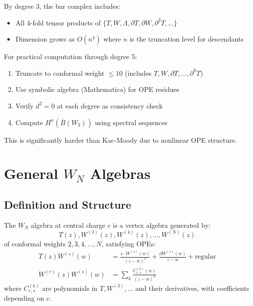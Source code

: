 \begin{remark}
By degree 3, the bar complex includes:
\begin{itemize}
\item All 4-fold tensor products of $\{T, W, \Lambda, \partial T, \partial W, \partial^2 T, \ldots\}$
\item Dimension grows as $O(n^4)$ where $n$ is the truncation level for descendants
\end{itemize}

For practical computation through degree 5:
\begin{enumerate}
\item Truncate to conformal weight $\le 10$ (includes $T, W, \partial T, \ldots, \partial^8 T$)
\item Use symbolic algebra (Mathematica) for OPE residues
\item Verify $d^2 = 0$ at each degree as consistency check
\item Compute $H^n(\bar{B}(W_3))$ using spectral sequences
\end{enumerate}

This is significantly harder than Kac-Moody due to nonlinear OPE structure.
\end{remark}

\section{General $W_N$ Algebras}

\subsection{Definition and Structure}

\begin{definition}[$W_N$ Algebra]
The $W_N$ algebra at central charge $c$ is a vertex algebra generated by:
$$T(z), W^{(3)}(z), W^{(4)}(z), \ldots, W^{(N)}(z)$$
of conformal weights $2, 3, 4, \ldots, N$, satisfying OPEs:
\begin{align*}
T(z)W^{(s)}(w) &= \frac{s \cdot W^{(s)}(w)}{(z-w)^2} + \frac{\partial W^{(s)}(w)}{z-w} + \text{regular} \\
W^{(r)}(z)W^{(s)}(w) &= \sum_{k} \frac{C_{r,s}^{(k)}(w)}{(z-w)^{k}}
\end{align*}
where $C_{r,s}^{(k)}$ are polynomials in $T, W^{(3)}, \ldots$ and their derivatives, with coefficients depending on $c$.
\end{definition}

